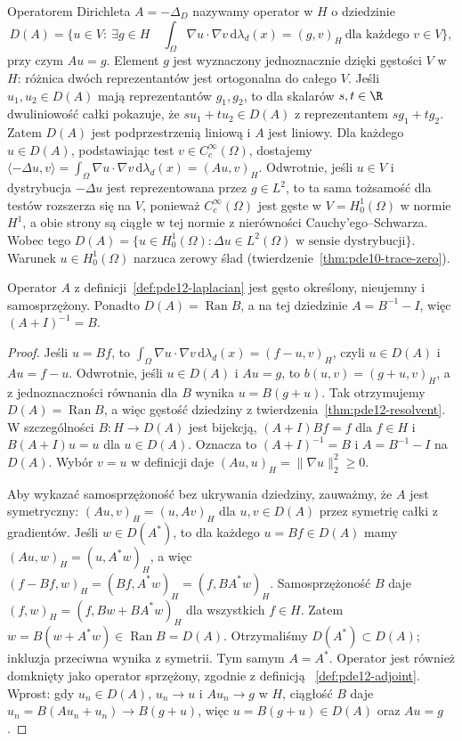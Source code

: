 \begin{definicja}
\label{def:pde12-laplacian}
Operatorem Dirichleta $A=-\Delta_D$ nazywamy operator w $H$
o dziedzinie
\[
D(A)=\big\{u\in V:\ \exists g\in H\quad
\int_\Omega\nabla u\cdot\nabla v\,\mathrm d\lambda_d(x)
=(g,v)_H\ \text{dla każdego }v\in V\big\},
\]
przy czym $Au=g$. Element $g$ jest wyznaczony
jednoznacznie dzięki gęstości $V$ w $H$: różnica dwóch
reprezentantów jest ortogonalna do całego $V$.
Jeśli $u_1,u_2\in D(A)$ mają reprezentantów $g_1,g_2$,
to dla skalarów $s,t\in\R$ dwuliniowość całki pokazuje,
że $su_1+tu_2\in D(A)$ z reprezentantem $sg_1+tg_2$.
Zatem $D(A)$ jest podprzestrzenią liniową i $A$ jest liniowy.
Dla każdego $u\in D(A)$, podstawiając test
$v\in C_c^\infty(\Omega)$, dostajemy
$\langle-\Delta u,v\rangle=
\int_\Omega\nabla u\cdot\nabla v\,\mathrm d\lambda_d(x)
=(Au,v)_H$. Odwrotnie, jeśli $u\in V$ i dystrybucja
$-\Delta u$ jest reprezentowana przez $g\in L^2$, to ta
sama tożsamość dla testów rozszerza się na $V$,
ponieważ $C_c^\infty(\Omega)$ jest gęste w $V=H_0^1(\Omega)$
w normie $H^1$, a obie strony są ciągłe w tej normie
z nierówności Cauchy'ego--Schwarza.
Wobec tego
$D(A)=\{u\in H_0^1(\Omega):\Delta u\in L^2(\Omega)
\text{ w sensie dystrybucji}\}$.
Warunek $u\in H_0^1(\Omega)$ narzuca zerowy ślad
(twierdzenie~\ref{thm:pde10-trace-zero}).
\end{definicja}

\begin{twierdzenie}
\label{thm:pde12-A-selfadjoint}
Operator $A$ z definicji~\ref{def:pde12-laplacian} jest
gęsto określony, nieujemny i samosprzężony.
Ponadto $D(A)=\operatorname{Ran}B$, a na tej dziedzinie
$A=B^{-1}-I$, więc $(A+I)^{-1}=B$.
\end{twierdzenie}
\begin{proof}
Jeśli $u=Bf$, to
$\int_\Omega\nabla u\cdot\nabla v\,\mathrm d\lambda_d(x)
=(f-u,v)_H$, czyli $u\in D(A)$ i $Au=f-u$.
Odwrotnie, jeśli $u\in D(A)$ i $Au=g$, to
$b(u,v)=(g+u,v)_H$, a z jednoznaczności równania
dla $B$ wynika $u=B(g+u)$. Tak otrzymujemy
$D(A)=\operatorname{Ran}B$, a więc gęstość dziedziny
z twierdzenia~\ref{thm:pde12-resolvent}.
W szczególności $B:H\to D(A)$ jest bijekcją,
$(A+I)Bf=f$ dla $f\in H$ i $B(A+I)u=u$ dla $u\in D(A)$.
Oznacza to $(A+I)^{-1}=B$ i $A=B^{-1}-I$ na $D(A)$.
Wybór $v=u$ w definicji daje
$(Au,u)_H=\|\nabla u\|_2^2\ge0$.

Aby wykazać samosprzężoność bez ukrywania dziedziny,
zauważmy, że $A$ jest symetryczny:
$(Au,v)_H=(u,Av)_H$ dla $u,v\in D(A)$
przez symetrię całki z gradientów. Jeśli $w\in D(A^*)$,
to dla każdego $u=Bf\in D(A)$ mamy
$(Au,w)_H=(u,A^*w)_H$, a więc
$(f-Bf,w)_H=(Bf,A^*w)_H=(f,BA^*w)_H$.
Samosprzężoność $B$ daje
$(f,w)_H=(f,Bw+BA^*w)_H$ dla wszystkich $f\in H$.
Zatem $w=B(w+A^*w)\in\operatorname{Ran}B=D(A)$.
Otrzymaliśmy $D(A^*)\subset D(A)$; inkluzja przeciwna
wynika z symetrii. Tym samym $A=A^*$. Operator jest również domknięty
jako operator sprzężony, zgodnie z definicją
~\ref{def:pde12-adjoint}. Wprost: gdy $u_n\in D(A)$,
$u_n\to u$ i $Au_n\to g$ w $H$, ciągłość $B$ daje
$u_n=B(Au_n+u_n)\to B(g+u)$, więc
$u=B(g+u)\in D(A)$ oraz $Au=g$.
\end{proof}

